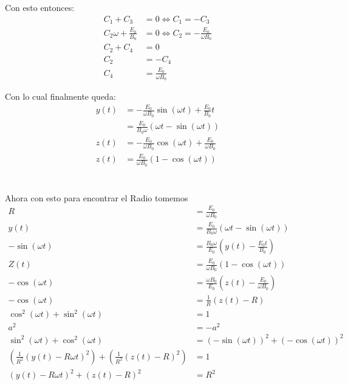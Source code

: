 \documentclass{report}
\begin{document}
Con esto entonces:
\begin{align*}
	C_1 + C_3 &= 0 \iff C_1 = - C_3\\
	C_2 \omega + \frac{E_0}{B_0} &= 0 \iff C_2 = - \frac{E_0}{\omega B_0}\\
	C_2 + C_4 &= 0\\
	C_2 &= - C_4\\
	C_4 &= \frac{E_0}{\omega B_0}
\end{align*}

Con lo cual finalmente queda:
\begin{align*}
	y(t) &= - \frac{E_0}{\omega B_0} \sin \left(\omega t\right) + \frac{E_0}{B_0} t\\
	&= \frac{E_0}{B_0 \omega} \left( \omega t - \sin \left(\omega t \right)\right)\\
	z(t) &= - \frac{E_0}{\omega B_0} \cos\left(\omega t\right) + \frac{E_0}{\omega B_0}\\
	z(t) &= \frac{E_0}{\omega B_0} \left( 1 - \cos\left(\omega t\right)\right)
\end{align*}

\section{}

Ahora con esto para encontrar el Radio tomemos
\begin{align*}
	R &= \frac{E_0}{\omega B_0}\\
	y(t) &= \frac{E_0}{B_0 \omega} \left(\omega t - \sin\left(\omega t\right)\right)\\
	- \sin \left(\omega t\right) &= \frac{B_0 \omega}{E_0} \left(y(t) - \frac{E_0 t}{B_0}\right)\\
	Z(t) &= \frac{E_0}{\omega B_0} \left(1 - \cos\left(\omega t \right)\right)\\
	- \cos\left(\omega t\right) &= \frac{\omega B_0}{E_0}\left(z(t) - \frac{E_0}{\omega B_0}\right)\\
	- \cos\left(\omega t\right) &= \frac{1}{R} \left( z(t) - R\right)\\
	\cos^2\left(\omega t\right) + \sin^2\left(\omega t\right) &= 1\\
	a^2 &= -a^2\\
	\sin^2\left(\omega t\right) + \cos^2\left(\omega t\right) &= \left(- \sin\left(\omega t\right)\right)^2 + \left(- \cos\left(\omega t\right)\right)^2\\
	\left(\frac{1}{R^2} \left(y(t) - R \omega t\right)^2\right) + \left(\frac{1}{R^2} \left(z(t) - R \right)^2\right) &= 1\\
	\left(y(t) - R\omega t\right)^2 + \left(z(t) - R\right)^2 &= R^2
\end{align*}
\end{document}
